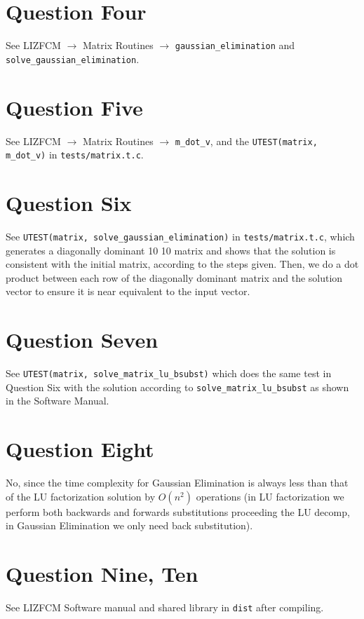 \documentclass[11pt]{article}
\begin{document}
\section{Question Four}
\label{sec:orgf7d23bb}

See LIZFCM \(\rightarrow\) Matrix Routines \(\rightarrow\) \texttt{gaussian\_elimination} and \texttt{solve\_gaussian\_elimination}.

\section{Question Five}
\label{sec:org54e966c}
See LIZFCM \(\rightarrow\) Matrix Routines \(\rightarrow\) \texttt{m\_dot\_v}, and the \texttt{UTEST(matrix, m\_dot\_v)} in
\texttt{tests/matrix.t.c}.

\section{Question Six}
\label{sec:org413b527}
See \texttt{UTEST(matrix, solve\_gaussian\_elimination)} in \texttt{tests/matrix.t.c}, which generates a diagonally dominant 10 \texttimes{} 10 matrix
and shows that the solution is consistent with the initial matrix, according to the steps given. Then,
we do a dot product between each row of the diagonally dominant matrix and the solution vector to ensure
it is near equivalent to the input vector.

\section{Question Seven}
\label{sec:orgd3d7443}
See \texttt{UTEST(matrix, solve\_matrix\_lu\_bsubst)} which does the same test in Question Six with the solution according to
\texttt{solve\_matrix\_lu\_bsubst} as shown in the Software Manual.

\section{Question Eight}
\label{sec:orgf8ac9bf}
No, since the time complexity for Gaussian Elimination is always less than that of the LU factorization solution by \(O(n^2)\) operations
(in LU factorization we perform both backwards and forwards substitutions proceeding the LU decomp, in Gaussian Elimination we only need
back substitution).

\section{Question Nine, Ten}
\label{sec:orgb270171}
See LIZFCM Software manual and shared library in \texttt{dist} after compiling.
\end{document}
